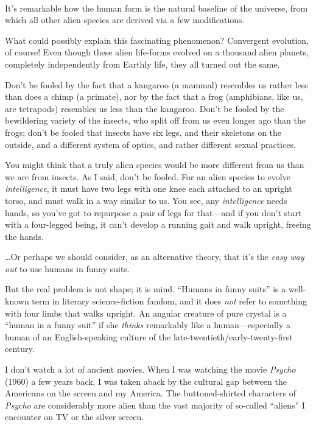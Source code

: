 \bigskip

{
 ~}

{
 It's remarkable how the human form is the natural
baseline of the universe, from which all other alien species are
derived via a few modifications.}

{
 What could possibly explain this fascinating phenomenon?
Convergent evolution, of course! Even though these alien life-forms
evolved on a thousand alien planets, completely independently from
Earthly life, they all turned out the same.}

{
 Don't be fooled by the fact that a kangaroo (a
mammal) resembles us rather less than does a chimp (a primate), nor by
the fact that a frog (amphibians, like us, are tetrapods) resembles us
less than the kangaroo. Don't be fooled by the
bewildering variety of the insects, who split off from us even longer
ago than the frogs; don't be fooled that insects have
six legs, and their skeletons on the outside, and a different system of
optics, and rather different sexual practices.}

{
 You might think that a truly alien species would be more different
from us than we are from insects. As I said, don't be
fooled. For an alien species to evolve \textit{intelligence}, it must
have two legs with one knee each attached to an upright torso, and must
walk in a way similar to us. You see, any \textit{intelligence} needs
hands, so you've got to repurpose a pair of legs for
that---and if you don't start with a four-legged being,
it can't develop a running gait and walk upright,
freeing the hands.}

{
 \ldots Or perhaps we should consider, as an alternative theory,
that it's the \textit{easy way out} to use humans in
funny suits.}

{
 But the real problem is not shape; it is mind.
``Humans in funny suits'' is a
well-known term in literary science-fiction fandom, and it does
\textit{not} refer to something with four limbs that walks upright. An
angular creature of pure crystal is a ``human in a
funny suit'' if she \textit{thinks} remarkably like a
human---especially a human of an English-speaking culture of the
late-twentieth/early-twenty-first century.}

{
 I don't watch a lot of ancient movies. When I was
watching the movie \textit{Psycho} (1960) a few years back, I was taken
aback by the cultural gap between the Americans on the screen and my
America. The buttoned-shirted characters of \textit{Psycho} are
considerably more alien than the vast majority of so-called
``aliens'' I encounter on TV or the
silver screen.}

